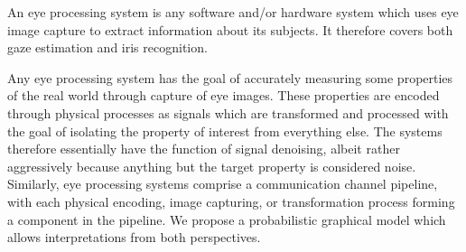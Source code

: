 An eye processing system is any software and/or hardware system which uses eye image capture to extract information about its subjects. It therefore covers both gaze estimation and iris recognition. 









Any eye processing system has the goal of accurately measuring some properties of the real world through capture of eye images. These properties are encoded through physical processes as signals which are transformed and processed with the goal of isolating the property of interest from everything else. The systems therefore essentially have the function of signal denoising, albeit rather aggressively because anything but the target property is considered noise. Similarly, eye processing systems comprise a communication channel pipeline, with each physical encoding, image capturing, or transformation process forming a component in the pipeline. We propose a probabilistic graphical model which allows interpretations from both perspectives. 


